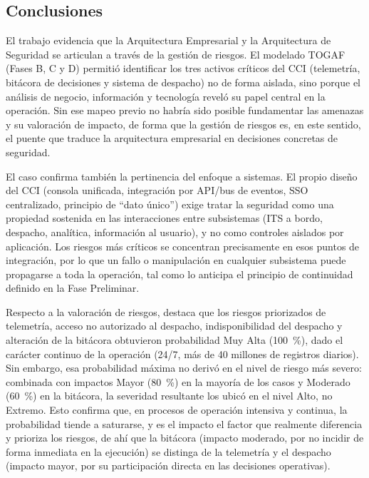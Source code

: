 \subsection{Conclusiones}

El trabajo evidencia que la Arquitectura Empresarial y la Arquitectura de Seguridad se articulan a través de la gestión de riesgos. El modelado TOGAF (Fases B, C y D) permitió identificar los tres activos críticos del CCI (telemetría, bitácora de decisiones y sistema de despacho) no de forma aislada, sino porque el análisis de negocio, información y tecnología reveló su papel central en la operación. Sin ese mapeo previo no habría sido posible fundamentar las amenazas y su valoración de impacto, de forma que la gestión de riesgos es, en este sentido, el puente que traduce la arquitectura empresarial en decisiones concretas de seguridad.

El caso confirma también la pertinencia del enfoque a sistemas. El propio diseño del CCI (consola unificada, integración por API/bus de eventos, SSO centralizado, principio de ``dato único'') exige tratar la seguridad como una propiedad sostenida en las interacciones entre subsistemas (ITS a bordo, despacho, analítica, información al usuario), y no como controles aislados por aplicación. Los riesgos más críticos se concentran precisamente en esos puntos de integración, por lo que un fallo o manipulación en cualquier subsistema puede propagarse a toda la operación, tal como lo anticipa el principio de continuidad definido en la Fase Preliminar.

Respecto a la valoración de riesgos, destaca que los riesgos priorizados de telemetría, acceso no autorizado al despacho, indisponibilidad del despacho y alteración de la bitácora obtuvieron probabilidad Muy Alta (100~\%), dado el carácter continuo de la operación (24/7, más de 40 millones de registros diarios). Sin embargo, esa probabilidad máxima no derivó en el nivel de riesgo más severo: combinada con impactos Mayor (80~\%) en la mayoría de los casos y Moderado (60~\%) en la bitácora, la severidad resultante los ubicó en el nivel Alto, no Extremo. Esto confirma que, en procesos de operación intensiva y continua, la probabilidad tiende a saturarse, y es el impacto el factor que realmente diferencia y prioriza los riesgos, de ahí que la bitácora (impacto moderado, por no incidir de forma inmediata en la ejecución) se distinga de la telemetría y el despacho (impacto mayor, por su participación directa en las decisiones operativas).

